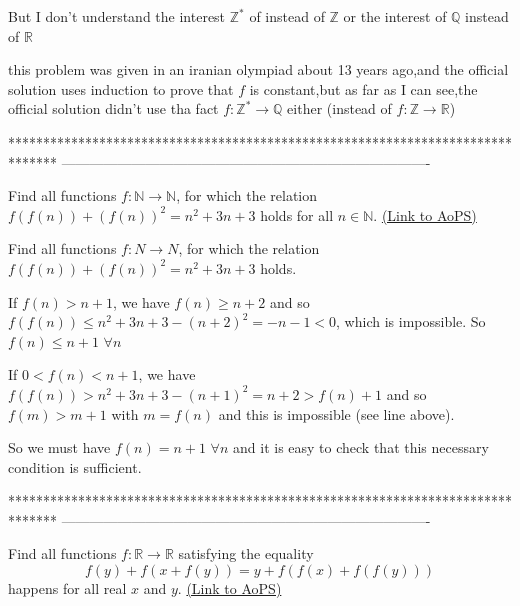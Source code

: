 \begin{solution}
	\begin{tcolorbox}But I don't understand the interest $ \mathbb{Z}^{*}$ of  instead of $ \mathbb{Z}$ or the interest of $ \mathbb{Q}$ instead of $ \mathbb{R}$\end{tcolorbox}

this problem was given in an iranian olympiad about 13 years ago,and the official solution uses induction to prove that $ f$ is constant,but as far as I can see,the official solution didn't use tha fact $ f: \mathbb{Z}^{*}\to\mathbb{Q}$ either (instead of $ f: \mathbb{Z}\to\mathbb{R}$)
\end{solution}
*******************************************************************************
-------------------------------------------------------------------------------

\begin{problem}
	Find all functions $f: \mathbb N \to \mathbb N$, for which the relation $ f (f (n)) + (f (n))^2 = n^2 + 3n + 3$ holds for all $n \in \mathbb N$.
	\flushright \href{https://artofproblemsolving.com/community/c6h185525}{(Link to AoPS)}
\end{problem}



\begin{solution}
	\begin{tcolorbox}Find all functions $ f : N\rightarrow N$, for which the relation $ f (f (n)) + (f (n))^2 = n^2 + 3n + 3$ holds.\end{tcolorbox}

If $ f(n)>n+1$, we have $ f(n)\geq n+2$ and so $ f(f(n))\leq n^2+3n+3-(n+2)^2=-n-1<0$, which is impossible. So $ f(n)\leq n+1$ $ \forall n$

If $ 0<f(n)<n+1$, we have $ f(f(n))>n^2+3n+3-(n+1)^2=n+2>f(n)+1$ and so $ f(m)>m+1$ with $ m=f(n)$ and this is impossible (see line above).

So we must have $ f(n)=n+1$ $ \forall n$ and it is easy to check that this necessary condition is sufficient.
\end{solution}
*******************************************************************************
-------------------------------------------------------------------------------

\begin{problem}
	Find all functions $f: \mathbb R \to \mathbb R$ satisfying the equality $$ f (y) + f (x + f (y)) = y + f (f (x) + f (f (y)))$$ happens for all real $ x$ and $ y$.
	\flushright \href{https://artofproblemsolving.com/community/c6h185527}{(Link to AoPS)}
\end{problem}



